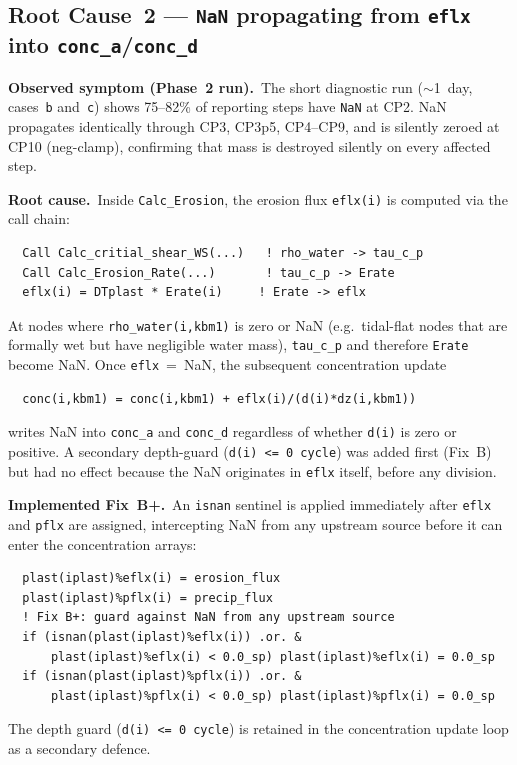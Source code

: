 \documentclass[11pt]{article}
\begin{document}
\subsection*{Root Cause~2 --- \texttt{NaN} propagating from \texttt{eflx}
into \texttt{conc\_a}/\texttt{conc\_d}}

\textbf{Observed symptom (Phase~2 run).}\
The short diagnostic run ($\sim$1~day, cases~\texttt{b} and~\texttt{c})
shows 75--82\% of reporting steps have \texttt{NaN} at CP2.
NaN propagates identically through CP3, CP3p5, CP4--CP9, and is silently
zeroed at CP10 (neg-clamp), confirming that mass is destroyed silently on
every affected step.

\textbf{Root cause.}\
Inside \texttt{Calc\_Erosion}, the erosion flux \texttt{eflx(i)} is computed
via the call chain:
\begin{verbatim}
  Call Calc_critial_shear_WS(...)   ! rho_water -> tau_c_p
  Call Calc_Erosion_Rate(...)       ! tau_c_p -> Erate
  eflx(i) = DTplast * Erate(i)     ! Erate -> eflx
\end{verbatim}
At nodes where \texttt{rho\_water(i,kbm1)} is zero or NaN (e.g.\ tidal-flat
nodes that are formally wet but have negligible water mass),
\texttt{tau\_c\_p} and therefore \texttt{Erate} become NaN.
Once \texttt{eflx}~=~NaN, the subsequent concentration update
\begin{verbatim}
  conc(i,kbm1) = conc(i,kbm1) + eflx(i)/(d(i)*dz(i,kbm1))
\end{verbatim}
writes NaN into \texttt{conc\_a} and \texttt{conc\_d} regardless of whether
\texttt{d(i)} is zero or positive.
A secondary depth-guard (\texttt{d(i)~<=~0 cycle}) was added first (Fix~B)
but had no effect because the NaN originates in \texttt{eflx} itself, before
any division.

\textbf{Implemented Fix~B+.}\
An \texttt{isnan} sentinel is applied immediately after \texttt{eflx} and
\texttt{pflx} are assigned, intercepting NaN from any upstream source before
it can enter the concentration arrays:
\begin{verbatim}
  plast(iplast)%eflx(i) = erosion_flux
  plast(iplast)%pflx(i) = precip_flux
  ! Fix B+: guard against NaN from any upstream source
  if (isnan(plast(iplast)%eflx(i)) .or. &
      plast(iplast)%eflx(i) < 0.0_sp) plast(iplast)%eflx(i) = 0.0_sp
  if (isnan(plast(iplast)%pflx(i)) .or. &
      plast(iplast)%pflx(i) < 0.0_sp) plast(iplast)%pflx(i) = 0.0_sp
\end{verbatim}
The depth guard (\texttt{d(i)~<=~0 cycle}) is retained in the concentration
update loop as a secondary defence.
\end{document}
